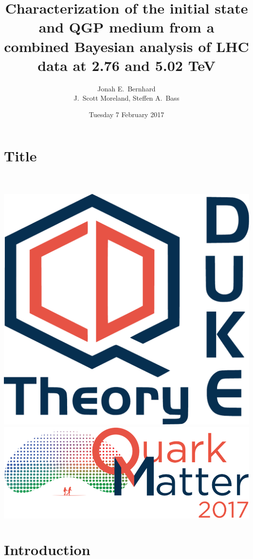 \documentclass{beamer}
\title[Bayesian characterization of the initial state and QGP medium]{
  Characterization of the initial state and QGP medium from a combined Bayesian analysis of LHC data at 2.76 and 5.02 TeV
}
\author[J.\ E.\ Bernhard]{Jonah E.\ Bernhard \\ J.\ Scott Moreland, Steffen A.\ Bass}
\institute[Duke U.]{Duke University}
\date{Tuesday 7 February 2017}
\begin{document}
\section{Title}

\begin{frame}
  \rm{}
  \centering
  \vspace{.15\textheight}
  {\color{theme}\Large\inserttitle} \\[.05\textheight]
  \insertauthor \\[.1\textheight]
  \includegraphics[height=.1\textheight]{logos/dukeqcd}
  \hspace{.08\textwidth}
  \includegraphics[height=.1\textheight]{logos/qm2017}
\end{frame}


\section{Introduction}
\end{document}
